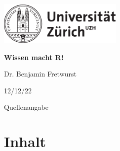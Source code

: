 \documentclass[twoside, pagesize, fontsize=11pt, dvipsnames]{scrreport}
\begin{document}
\begin{titlepage}
\sffamily
\setlength\parindent{0pt}

\hfill \includegraphics[width = 6cm]{images/uzh_logo_d_pos.pdf}\par

\vspace{5cm}


{\bfseries \fontsize{20}{26} \selectfont Wissen macht R!} \\[1ex]


\vfill

Dr. Benjamin Fretwurst\\

\vfill
{\large }
\raggedright



12/12/22 \\[.5cm]
\clearpage

\vspace*{4cm}

Quellenangabe\\[.5cm]



\end{titlepage}


\makeatletter
{}
\makeatletter

\renewcommand{\listoftables}{\@starttoc{lot}}
\renewcommand{\tableofcontents}{\@starttoc{toc}}
\renewcommand{\listoffigures}{\@starttoc{lof}}

\renewcommand{\l@table}{\@dottedtocline{1}{1em}{3em}}
\makeatother

\clearpage
\section*{Inhalt}
\label{sec:inhalt}
\end{document}

